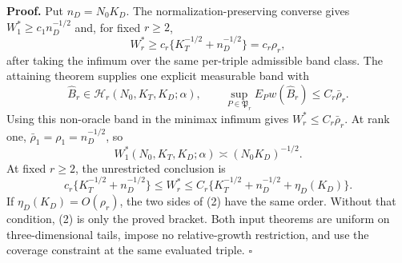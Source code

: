 \textbf{Proof.}
Put \(n_D=N_0K_D\). The normalization-preserving converse gives \(W_1^*\ge c_1n_D^{-1/2}\) and, for fixed \(r\ge2\),
\[
 W_r^*\ge c_r\{K_T^{-1/2}+n_D^{-1/2}\}=c_r\rho_r,
\]
after taking the infimum over the same per-triple admissible band class. The attaining theorem supplies one explicit measurable band with
\[
 \widehat B_r\in\mathcal H_r(N_0,K_T,K_D;\alpha),
 \qquad \sup_{P\in\mathfrak P_r}E_Pw(\widehat B_r)
 \le C_r\bar\rho_r.                                      \tag{1}
\]
Using this non-oracle band in the minimax infimum gives \(W_r^*\le C_r\bar\rho_r\). At rank one, \(\bar\rho_1=\rho_1=n_D^{-1/2}\), so
\[
 W_1^*(N_0,K_T,K_D;\alpha)\asymp(N_0K_D)^{-1/2}.
\]
At fixed \(r\ge2\), the unrestricted conclusion is
\[
 c_r\{K_T^{-1/2}+n_D^{-1/2}\}
 \le W_r^*\le C_r\{K_T^{-1/2}+n_D^{-1/2}+\eta_D(K_D)\}. \tag{2}
\]
If \(\eta_D(K_D)=O(\rho_r)\), the two sides of (2) have the same order. Without that condition, (2) is only the proved bracket. Both input theorems are uniform on three-dimensional tails, impose no relative-growth restriction, and use the coverage constraint at the same evaluated triple. \(\square\)